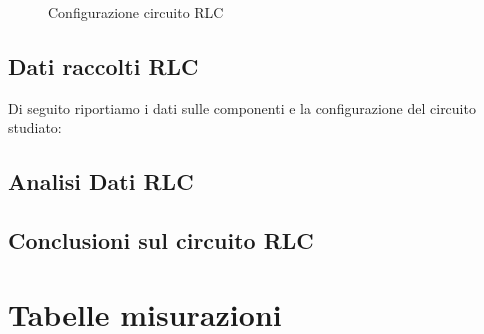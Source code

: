 \documentclass[letterpaper,12pt]{article}
\begin{document}
\begin{figure}[h!]
    \centering
    \caption{Configurazione circuito RLC}
    \label{fig:configRLC}
\end{figure}



\subsection{Dati raccolti RLC} 
Di seguito riportiamo i dati sulle componenti e la configurazione del circuito studiato:

\newpage
\subsection{Analisi Dati RLC}

\newpage
\subsection{Conclusioni sul circuito RLC}


\newpage
\section{Tabelle misurazioni}
\end{document}
